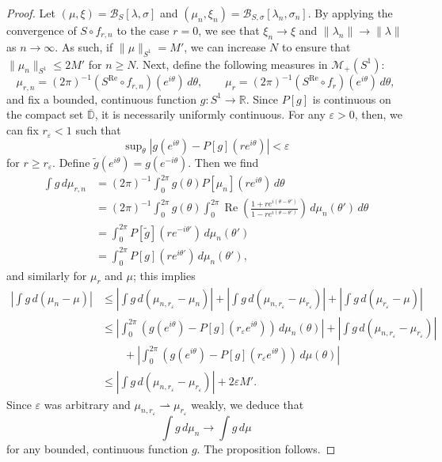 \documentclass[10pt,a4paper]{amsart}
\newcommand{\DD}{\mathbb D}
\newcommand{\RR}{\mathbb R}
\renewcommand{\Re}{\op{Re}}
\newcommand{\cB}{\mathcal B}
\newcommand{\cM}{\mathcal M}
\newcommand{\eps}{\varepsilon}
\newcommand{\op}{\operatorname}
\newcommand{\ovl}[1]{{\overline{#1}}}
\begin{document}
\begin{proof}
    Let $(\mu,\xi) = \cB_{S}[\lambda,\sigma]$ and $(\mu_n,\xi_n) = \cB_{S,\sigma}[\lambda_n,\sigma_n]$. By applying the convergence of $S\circ f_{r,n}$ to the case $r=0$, we see that $\xi_n\to\xi$ and $\|\lambda_n\|\to\|\lambda\|$ as $n\to\infty$. As such, if $\|\mu\|_{S^1} = M'$, we can increase $N$ to ensure that $\|\mu_n\|_{S^1}\leq 2M'$ for $n\geq N$. Next, define the following measures in $\cM_+(S^1)$:
    \[\mu_{r,n} = (2\pi)^{-1} (S^{\Re}\circ f_{r,n})(e^{i\theta})\,d\theta,\qquad \mu_r = (2\pi)^{-1} (S^{\Re}\circ f_r)(e^{i\theta})\,d\theta,\]
    and fix a bounded, continuous function $g:S^1\to\RR$. Since $P[g]$ is continuous on the compact set $\ovl{\DD}$, it is necessarily uniformly continuous. For any $\eps>0$, then, we can fix $r_\eps<1$ such that
    \[\sup\nolimits_\theta\left|g(e^{i\theta}) - P[g](re^{i\theta})\right|<\eps\]
    for $r\geq r_\eps$. Define $\widetilde{g}(e^{i\theta})=g(e^{-i\theta})$. Then we find
    \begin{align*}
        \int g\,d\mu_{r,n} &= (2\pi)^{-1}\int_0^{2\pi} g(\theta) P[\mu_n](re^{i\theta})\,d\theta\\
        &= (2\pi)^{-1}\int_0^{2\pi} g(\theta) \int_0^{2\pi} \Re\left(\frac{1+re^{i(\theta-\theta')}}{1-re^{i(\theta-\theta')}}\right)\,d\mu_n(\theta')\,d\theta\\
        &= \int_0^{2\pi} P[\widetilde{g}](re^{-i\theta'})\,d\mu_n(\theta')\\
        &= \int_0^{2\pi} P[g](re^{i\theta'})\,d\mu_n(\theta'),
    \end{align*}
    and similarly for $\mu_r$ and $\mu$; this implies
    \begin{align*}\left|\int g\,d(\mu_{n} - \mu) \right| &\leq \left|\int g\,d(\mu_{n,r_\eps} - \mu_n) \right| + \left|\int g\,d(\mu_{n,r_\eps}-\mu_{r_\eps}) \right| + \left|\int g \,d(\mu_{r_\eps} - \mu) \right|\\
    &\leq \left|\int_0^{2\pi} \left(g(e^{i\theta})-P[g](r_\eps e^{i\theta})\right)\,d\mu_n(\theta) \right| + \left|\int g\,d(\mu_{n,r_\eps}-\mu_{r_\eps}) \right| \\
    &\qquad+ \left|\int_0^{2\pi} \left(g(e^{i\theta})-P[g](r_\eps e^{i\theta})\right)\,d\mu(\theta) \right|\\
    &\leq \left|\int g\,d(\mu_{n,r_\eps}-\mu_{r_\eps}) \right| + 2\eps M'.
    \end{align*}
    Since $\eps$ was arbitrary and $\mu_{n,r_\eps}\rightharpoonup\mu_{r_\eps}$ weakly, we deduce that
    \[\int g\,d\mu_n\to \int g\,d\mu\]
    for any bounded, continuous function $g$. The proposition follows.
\end{proof}
\end{document}
